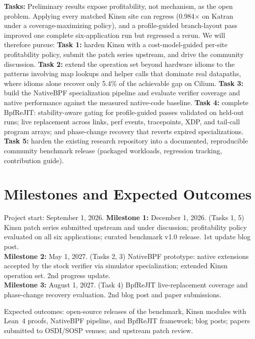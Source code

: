 \noindent\textbf{Tasks:} Preliminary results expose profitability, not mechanism, as the open problem. Applying every matched Kinsn site can regress (0.984$\times$ on Katran under a coverage-maximizing policy), and a profile-guided branch-layout pass improved one complete six-application run but regressed a rerun.  We will therefore pursue: \textbf{Task 1:} harden Kinsn with a cost-model-guided per-site profitability policy, submit the patch series upstream, and drive the community discussion.  \textbf{Task 2:} extend the operation set beyond hardware idioms to the patterns involving map lookups and helper calls that dominate real datapaths, where idioms alone recover only 5.4\% of the achievable gap on Cilium.  \textbf{Task 3:} build the NativeBPF specialization pipeline and evaluate verifier coverage and native performance against the measured native-code baseline.  \textbf{Task 4:} complete BpfReJIT: stability-aware gating for profile-guided passes validated on held-out runs; live replacement across links, perf events, tracepoints, XDP, and tail-call program arrays; and phase-change recovery that reverts expired specializations.  \textbf{Task 5:} harden the existing research repository into a documented, reproducible community benchmark release (packaged workloads, regression tracking, contribution guide).

\section{Milestones and Expected Outcomes}

\noindent Project start: September 1, 2026.
\textbf{Milestone 1:} December 1, 2026. (Tasks 1, 5) Kinsn patch series submitted upstream and under discussion; profitability policy evaluated on all six applications; curated benchmark v1.0 release. 1st update blog post.\\
\textbf{Milestone 2:} May 1, 2027. (Tasks 2, 3) NativeBPF prototype: native extensions accepted by the stock verifier via simulator specialization; extended Kinsn operation set. 2nd progress update.\\
\textbf{Milestone 3:} August 1, 2027. (Task 4) BpfReJIT live-replacement coverage and phase-change recovery evaluation. 2nd blog post and paper submissions.

Expected outcomes: open-source releases of the benchmark, Kinsn modules with Lean~4 proofs, NativeBPF pipeline, and BpfReJIT framework; blog posts; papers submitted to OSDI/SOSP venues; and upstream patch review.
